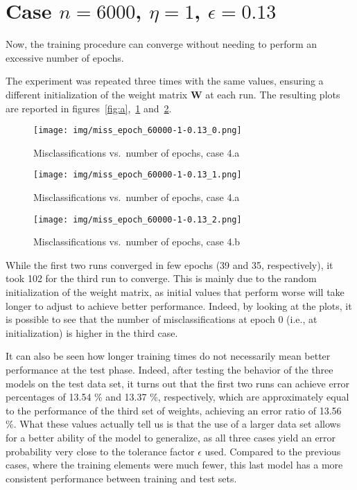 \documentclass[12pt]{article}
\begin{document}
\section{Case $n=6000$, $\eta=1$, $\epsilon=0.13$}

Now, the training procedure can converge without needing to perform an excessive number of epochs.

The experiment was repeated three times with the same values, ensuring a different initialization of the weight matrix $\textbf{W}$ at each run.
The resulting plots are reported in figures\ \ref{fig:a},\ \ref{fig:b} and\ \ref{fig:c}.

\begin{figure} [ht]
  \begin{minipage}{0.45\linewidth}
  \centering
    \texttt{[image: img/miss\_epoch\_60000-1-0.13\_0.png]}
    \caption{Misclassifications vs.\ number of epochs, case 4.a}
    \label{fig:a}
  \end{minipage}
  \hspace{0.5cm}
  \begin{minipage}{0.45\linewidth}
  \centering
    \texttt{[image: img/miss\_epoch\_60000-1-0.13\_1.png]}
    \caption{Misclassifications vs.\ number of epochs, case 4.a}
    \label{fig:b}
  \end{minipage}
\end{figure}

\begin{figure}[ht]
  \centering
  \texttt{[image: img/miss\_epoch\_60000-1-0.13\_2.png]}
  \caption{Misclassifications vs.\ number of epochs, case 4.b}
  \label{fig:c}
\end{figure}

While the first two runs converged in few epochs (39 and 35, respectively), it took 102 for the third run to converge.
This is mainly due to the random initialization of the weight matrix, as initial values that perform worse will take longer to adjust to achieve better performance.
Indeed, by looking at the plots, it is possible to see that the number of misclassifications at epoch 0 (i.e., at initialization) is higher in the third case.

It can also be seen how longer training times do not necessarily mean better performance at the test phase.
Indeed, after testing the behavior of the three models on the test data set, it turns out that the first two runs can achieve error percentages of 13.54 \% and 13.37 \%, respectively, which are approximately equal to the performance of the third set of weights, achieving an error ratio of 13.56 \%.
What these values actually tell us is that the use of a larger data set allows for a better ability of the model to generalize, as all three cases yield an error probability very close to the tolerance factor $\epsilon$ used.
Compared to the previous cases, where the training elements were much fewer, this last model has a more consistent performance between training and test sets.
\end{document}
